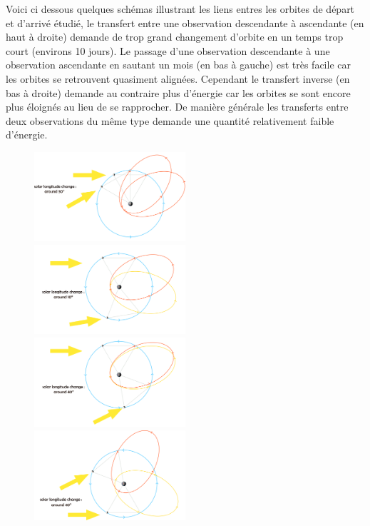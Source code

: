 \documentclass[12pt]{article} %
\begin{document}
		Voici ci dessous quelques schémas illustrant les liens entres les orbites de départ et d'arrivé étudié, le transfert entre une observation descendante à ascendante (en haut à droite) demande de trop grand changement d'orbite en un temps trop court (environs 10 jours). Le passage d'une observation descendante à une observation ascendante en sautant un mois (en bas à gauche) est très facile car les orbites se retrouvent quasiment alignées. Cependant le transfert inverse (en bas à droite) demande au contraire plus d'énergie car les orbites se sont encore plus éloignés au lieu de se rapprocher. De manière générale les transferts entre deux observations du même type demande une quantité relativement faible d'énergie.
		\begin{figure}[H]
			\includegraphics[width=0.5\textwidth]{images/1in2obs.png}
			\includegraphics[width=0.5\textwidth]{images/odd_to_even.png}
			\includegraphics[width=0.5\textwidth]{images/1in3_obs.png}
			\includegraphics[width=0.5\textwidth]{images/1in3_bad.png}
		\end{figure}
		
\end{document}
